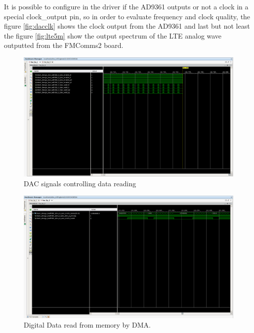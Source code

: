  It is possible to configure in the driver if the AD9361 outputs or not a clock
in a special clock\_output pin, so in order to evaluate frequency and clock
quality, the figure \ref{fig:dacclk} shows the clock output from the AD9361 and
last but not least the figure \ref{fig:lte5m} show the output spectrum of the
LTE analog wave outputted from the FMComms2 board.

\begin{figure}[htbp]
    \centering
    \includegraphics[width=1\textwidth,
    trim={{.15\textwidth} {1.2\textwidth} {.7\textwidth} {.16\textwidth}},
    clip]{./figures/dac_signals}
    \caption{ DAC signals controlling data reading
    \label{fig:dacsignals}}
\end{figure}

\begin{figure}[htbp]
    \centering
    \includegraphics[width=1\textwidth,
    trim={{.15\textwidth} {1.3\textwidth} {.05\textwidth} {.16\textwidth}},
    clip]{./figures/ila_dataflow}
    \caption{ Digital Data read from memory by DMA.
    \label{fig:dataflowdig}}
\end{figure}

